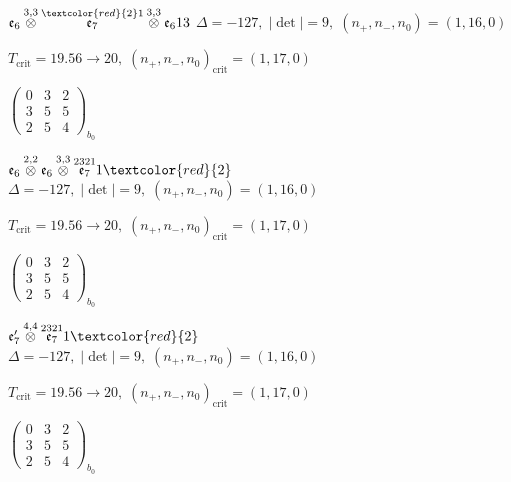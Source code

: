 \documentclass[10pt]{article}
\begin{document}
\smallskip

$\mathfrak{e}_6\overset{3,3}{\otimes}\overset{\textcolor{red}{2}1}{\mathfrak{e}_7}\overset{3,3}{\otimes}\mathfrak{e}_613$ \quad $\Delta=-127,\; |\det|=9,\; (n_+,n_-,n_0)=(1,16,0)$

\hspace{1em}$T_{\text{crit}}=19.56 \to 20,\; (n_+,n_-,n_0)_{\text{crit}}=(1,17,0)$

\hspace{2em}$\left(\begin{smallmatrix}0 & 3 & 2 \\ 3 & 5 & 5 \\ 2 & 5 & 4\end{smallmatrix}\right)_{\!b_0}$

\smallskip

$\mathfrak{e}_6\overset{2,2}{\otimes}\mathfrak{e}_6\overset{3,3}{\otimes}\overset{2321}{\mathfrak{e}_7}1\textcolor{red}{2}$ \quad $\Delta=-127,\; |\det|=9,\; (n_+,n_-,n_0)=(1,16,0)$

\hspace{1em}$T_{\text{crit}}=19.56 \to 20,\; (n_+,n_-,n_0)_{\text{crit}}=(1,17,0)$

\hspace{2em}$\left(\begin{smallmatrix}0 & 3 & 2 \\ 3 & 5 & 5 \\ 2 & 5 & 4\end{smallmatrix}\right)_{\!b_0}$

\smallskip

$\mathfrak{e}_7'\overset{4,4}{\otimes}\overset{2321}{\mathfrak{e}_7}1\textcolor{red}{2}$ \quad $\Delta=-127,\; |\det|=9,\; (n_+,n_-,n_0)=(1,16,0)$

\hspace{1em}$T_{\text{crit}}=19.56 \to 20,\; (n_+,n_-,n_0)_{\text{crit}}=(1,17,0)$

\hspace{2em}$\left(\begin{smallmatrix}0 & 3 & 2 \\ 3 & 5 & 5 \\ 2 & 5 & 4\end{smallmatrix}\right)_{\!b_0}$
\end{document}
